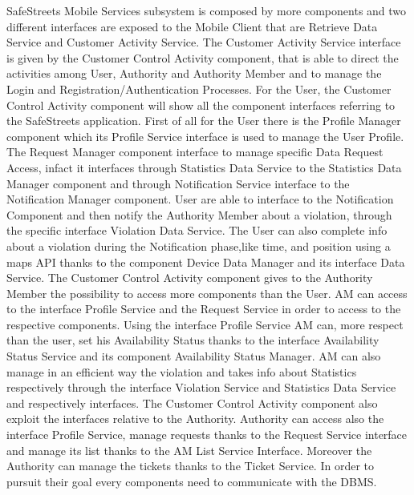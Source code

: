 \documentclass[12pt]{article}
\begin{document}
SafeStreets Mobile Services subsystem is composed by more components and two different interfaces are exposed to the Mobile Client that are Retrieve Data Service and Customer Activity Service. The Customer Activity Service interface is given by the  Customer Control Activity component, that is able to direct the activities among User, Authority and Authority Member and to manage the Login and Registration/Authentication Processes. For the User, the Customer Control Activity component will show all the component interfaces referring to the SafeStreets application. First of all for the User there is the Profile Manager component which its Profile Service interface is used to manage the User Profile. The Request Manager component interface to manage specific Data Request Access, infact it interfaces through Statistics Data Service to the Statistics Data Manager component and through Notification Service interface to the Notification Manager component. User are able to interface to the Notification Component and then notify the Authority Member about a violation, through the specific interface Violation Data Service. The User can also complete  info about a violation during the Notification phase,like time, and position using a maps API thanks to the component Device Data Manager and its interface Data Service. The Customer Control Activity component gives to the Authority Member the possibility to access more components than the User. AM can access to the interface Profile Service and the Request Service in order to access to the respective components. Using the interface Profile Service AM can, more respect than the user, set his Availability Status thanks to the interface Availability Status Service and its component Availability Status Manager. AM can also manage in an efficient way the violation and takes info about Statistics respectively through the interface Violation Service and Statistics Data Service and respectively interfaces.
The Customer Control Activity component also exploit the interfaces relative to the Authority. Authority can access also the interface Profile Service, manage requests thanks to the Request Service interface and manage its list thanks to the AM List Service Interface. Moreover the Authority can manage the tickets thanks to the Ticket Service.
In order to pursuit their goal every components need to communicate with the DBMS.
\end{document}
